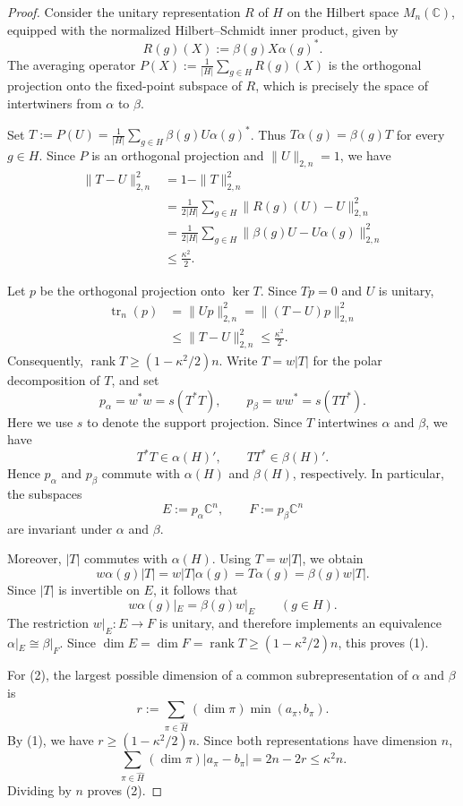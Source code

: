 \documentclass[12pt]{amsart}
\numberwithin{equation}{section}
\theoremstyle{definition}
\begin{document}
\begin{proof}
Consider the unitary representation $R$ of $H$ on
the Hilbert space $M_n(\mathbb C)$, equipped
with the normalized Hilbert--Schmidt inner
product, given by
\[
R(g)(X):=\beta(g)X\alpha(g)^*.
\]
The averaging operator $P(X):=\frac1{|H|}\sum_{g\in H}R(g)(X)$ is the orthogonal projection onto the fixed-point
subspace of $R$, which is precisely the space
of intertwiners from $\alpha$ to $\beta$.

Set $T:=P(U)
=\frac1{|H|}\sum_{g\in H}
\beta(g)U\alpha(g)^*$. 
Thus $T\alpha(g)=\beta(g)T$ for every $g\in H$.
Since $P$ is an orthogonal projection and
$\|U\|_{2,n}=1$, we have
\[
\begin{aligned}
\|T-U\|_{2,n}^2
&=1-\|T\|_{2,n}^2\\
&=\frac1{2|H|}\sum_{g\in H}
\|R(g)(U)-U\|_{2,n}^2\\
&=\frac1{2|H|}\sum_{g\in H}
\|\beta(g)U-U\alpha(g)\|_{2,n}^2\\
&\le\frac{\kappa^2}{2}.
\end{aligned}
\]

Let $p$ be the orthogonal projection onto
$\ker T$. Since $Tp=0$ and $U$ is unitary,
\[
\begin{aligned}
\operatorname{tr}_n(p)&=\|Up\|_{2,n}^2
=\|(T-U)p\|_{2,n}^2\\
&\le\|T-U\|_{2,n}^2\le\frac{\kappa^2}{2}.
\end{aligned}
\]
Consequently, $\operatorname{rank}T
\ge(1-\kappa^2/2)n$. 
Write $T=w|T|$ for the polar decomposition
of $T$, and set
\[
p_\alpha=w^*w=s(T^*T),
\qquad
p_\beta=ww^*=s(TT^*).
\]
Here we use $s$ to denote the support projection.  Since $T$ intertwines $\alpha$ and $\beta$,
we have
\[
T^*T\in\alpha(H)',
\qquad
TT^*\in\beta(H)'.
\]
Hence $p_\alpha$ and $p_\beta$ commute with
$\alpha(H)$ and $\beta(H)$, respectively.
In particular, the subspaces
\[
E:=p_\alpha\mathbb C^n,
\qquad
F:=p_\beta\mathbb C^n
\]
are invariant under $\alpha$ and $\beta$.

Moreover, $|T|$ commutes with $\alpha(H)$.
Using $T=w|T|$, we obtain
\[
w\alpha(g)|T|
=w|T|\alpha(g)
=T\alpha(g)
=\beta(g)w|T|.
\]
Since $|T|$ is invertible on $E$, it follows
that
\[
w\alpha(g)|_E=\beta(g)w|_E
\qquad(g\in H).
\]
The restriction $w|_E:E\to F$ is unitary,
and therefore implements an equivalence $\alpha|_E\cong\beta|_F$. 
Since $\dim E=\dim F=\operatorname{rank}T
\ge(1-\kappa^2/2)n$, 
this proves (1).

For (2), the largest possible dimension of
a common subrepresentation of $\alpha$
and $\beta$ is
\[
r:=\sum_{\pi\in\widehat H}
(\dim\pi)\min(a_\pi,b_\pi).
\]
By (1), we have $r\ge(1-\kappa^2/2)n$. 
Since both representations have dimension $n$,
\[
\sum_{\pi\in\widehat H}
(\dim\pi)|a_\pi-b_\pi|
=2n-2r \le\kappa^2 n.
\]
Dividing by $n$ proves (2).
\end{proof}
\end{document}
